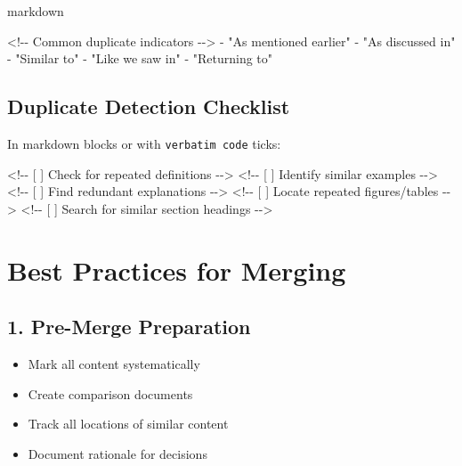 \documentclass[
  11pt,
  letterpaper,
]{book}
\newenvironment{Shaded}{\begin{snugshade}}{\end{snugshade}}
\newcommand{\CommentTok}[1]{\textcolor[rgb]{0.37,0.37,0.37}{#1}}
\newcommand{\NormalTok}[1]{\textcolor[rgb]{0.00,0.23,0.31}{#1}}
\newcommand{\SpecialStringTok}[1]{\textcolor[rgb]{0.13,0.47,0.30}{#1}}
\providecommand{\tightlist}{%
  \setlength{\itemsep}{0pt}\setlength{\parskip}{0pt}}
\begin{document}
markdown

\begin{Shaded}
\begin{Highlighting}[]
\CommentTok{\textless{}!{-}{-} Common duplicate indicators {-}{-}\textgreater{}}
\SpecialStringTok{{-} }\NormalTok{"As mentioned earlier"}
\SpecialStringTok{{-} }\NormalTok{"As discussed in"}
\SpecialStringTok{{-} }\NormalTok{"Similar to"}
\SpecialStringTok{{-} }\NormalTok{"Like we saw in"}
\SpecialStringTok{{-} }\NormalTok{"Returning to"}
\end{Highlighting}
\end{Shaded}

\subsection*{Duplicate Detection
Checklist}\label{duplicate-detection-checklist}

In markdown blocks or with \texttt{verbatim\ code} ticks:

\begin{Shaded}
\begin{Highlighting}[]
\CommentTok{\textless{}!{-}{-} [ ] Check for repeated definitions {-}{-}\textgreater{}}
\CommentTok{\textless{}!{-}{-} [ ] Identify similar examples {-}{-}\textgreater{}}
\CommentTok{\textless{}!{-}{-} [ ] Find redundant explanations {-}{-}\textgreater{}}
\CommentTok{\textless{}!{-}{-} [ ] Locate repeated figures/tables {-}{-}\textgreater{}}
\CommentTok{\textless{}!{-}{-} [ ] Search for similar section headings {-}{-}\textgreater{}}
\end{Highlighting}
\end{Shaded}

\section*{Best Practices for Merging}\label{best-practices-for-merging}


\subsection*{1. Pre-Merge Preparation}\label{pre-merge-preparation}

\begin{itemize}
\tightlist
\item
  Mark all content systematically
\item
  Create comparison documents
\item
  Track all locations of similar content
\item
  Document rationale for decisions
\end{itemize}
\end{document}
